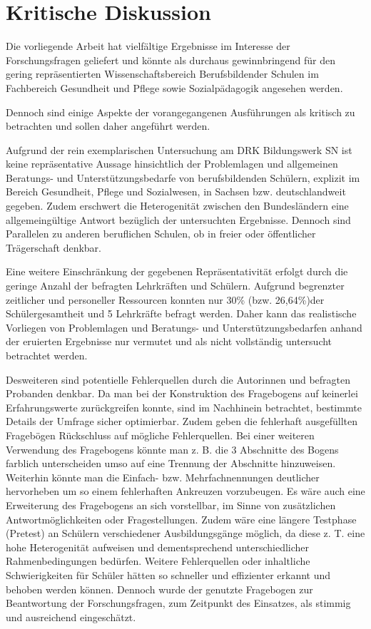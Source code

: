 \section{Kritische Diskussion}
\label{sec:KritischeDiskussion}

Die vorliegende Arbeit hat vielfältige Ergebnisse im Interesse der Forschungsfragen geliefert und könnte als durchaus gewinnbringend für den gering repräsentierten Wissenschaftsbereich Berufsbildender Schulen im Fachbereich Gesundheit und Pflege sowie Sozialpädagogik angesehen werden.

Dennoch sind einige Aspekte der vorangegangenen Ausführungen als kritisch zu betrachten und sollen daher angeführt werden.

Aufgrund der rein exemplarischen Untersuchung am DRK Bildungswerk SN ist keine repräsentative Aussage hinsichtlich der Problemlagen und allgemeinen Beratungs- und Unterstützungsbedarfe von berufsbildenden Schülern, explizit im Bereich Gesundheit, Pflege und Sozialwesen, in Sachsen bzw. deutschlandweit gegeben. Zudem erschwert die Heterogenität zwischen den Bundesländern eine allgemeingültige Antwort bezüglich der untersuchten Ergebnisse. Dennoch sind Parallelen zu anderen beruflichen Schulen, ob in freier oder öffentlicher Trägerschaft denkbar.

Eine weitere Einschränkung der gegebenen Repräsentativität erfolgt durch die geringe Anzahl der befragten Lehrkräften und Schülern. Aufgrund begrenzter zeitlicher und personeller Ressourcen konnten nur 30\%  (bzw. 26,64\%)der Schülergesamtheit und 5 Lehrkräfte befragt werden. Daher kann das realistische Vorliegen von Problemlagen und Beratungs- und Unterstützungsbedarfen anhand der eruierten Ergebnisse nur vermutet und als nicht vollständig untersucht betrachtet werden. 

Desweiteren sind potentielle Fehlerquellen durch die Autorinnen und befragten Probanden denkbar. Da man bei der Konstruktion des Fragebogens auf keinerlei Erfahrungswerte zurückgreifen konnte, sind im Nachhinein betrachtet, bestimmte Details der Umfrage sicher optimierbar. Zudem geben die fehlerhaft ausgefüllten Fragebögen Rückschluss auf mögliche Fehlerquellen. Bei einer weiteren Verwendung des Fragebogens könnte man z. B. die 3 Abschnitte des Bogens farblich unterscheiden umso auf eine Trennung der Abschnitte hinzuweisen. Weiterhin könnte man die Einfach- bzw. Mehrfachnennungen deutlicher hervorheben um so einem fehlerhaften Ankreuzen vorzubeugen. Es wäre auch eine Erweiterung des Fragebogens an sich vorstellbar, im Sinne von zusätzlichen Antwortmöglichkeiten oder Fragestellungen. Zudem wäre eine längere Testphase (Pretest) an Schülern verschiedener Ausbildungsgänge möglich, da diese z. T. eine hohe Heterogenität aufweisen und dementsprechend unterschiedlicher Rahmenbedingungen bedürfen. Weitere Fehlerquellen oder inhaltliche Schwierigkeiten für Schüler hätten so schneller und effizienter erkannt und behoben werden können. Dennoch wurde der genutzte Fragebogen zur Beantwortung der Forschungsfragen, zum Zeitpunkt des Einsatzes, als stimmig und ausreichend eingeschätzt.

